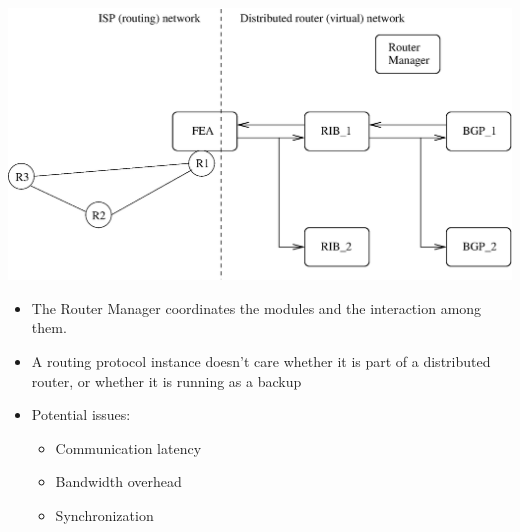\documentclass[landscape]{icsislides}
\begin{document}
\begin{slide}

\begin{center}
  \includegraphics[width=8.0in]{figs/distributed_router}
\end{center}

\end{slide}

\begin{slide}

\begin{itemize}

  \item The Router Manager coordinates the modules and the interaction among
  them.

  \item A routing protocol instance doesn't care whether it is part of a
  distributed router, or whether it is running as a backup

  \item Potential issues:
  \begin{itemize}
  \item Communication latency
  \item Bandwidth overhead
  \item Synchronization
  \end{itemize}

\end{itemize}

\end{slide}
\end{document}

